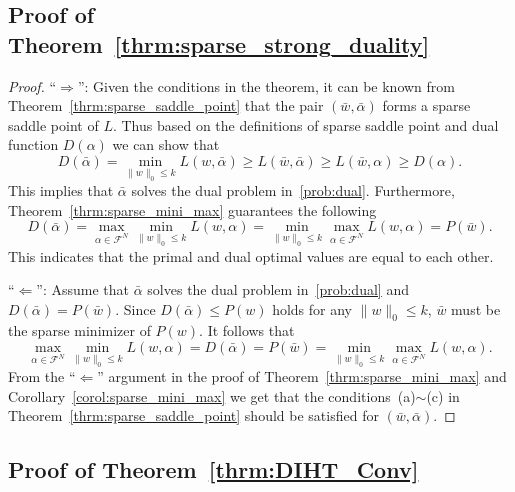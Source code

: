 \documentclass[11pt]{article}
\numberwithin{equation}{section}
\numberwithin{table}{section}
\numberwithin{figure}{section}
\begin{document}
\subsection{Proof of Theorem~\ref{thrm:sparse_strong_duality}}
\label{append:proof_sparse_strong_duality}
\begin{proof}
``$\Rightarrow$'': Given the conditions in the theorem, it can be known from Theorem~\ref{thrm:sparse_saddle_point} that the pair $(\bar w, \bar\alpha)$ forms a sparse saddle point of $L$. Thus based on the definitions of sparse saddle point and dual function $D(\alpha)$ we can show that
\[
D(\bar \alpha) = \min_{\|w\|_0\le k} L(w, \bar\alpha) \ge L(\bar w, \bar\alpha) \ge L(\bar w, \alpha)\ge D(\alpha).
\]
This implies that $\bar\alpha$ solves the dual problem in~\eqref{prob:dual}. Furthermore, Theorem~\ref{thrm:sparse_mini_max} guarantees the following
\[
D(\bar\alpha) = \max_{\alpha \in \mathcal{F}^N} \min_{\|w\|_0\le k} L(w, \alpha) =\min_{\|w\|_0\le k}\max_{\alpha \in \mathcal{F}^N} L(w,\alpha) = P(\bar w).
\]
This indicates that the primal and dual optimal values are equal to each other.

``$\Leftarrow$'': Assume that $\bar\alpha$ solves the dual problem in~\eqref{prob:dual} and $D(\bar\alpha) = P(\bar w)$. Since $D(\bar\alpha)\le P(w)$ holds for any $\|w\|_0\le k$, $\bar w$ must be the sparse minimizer of $P(w)$. It follows that
\[
\max_{\alpha \in \mathcal{F}^N} \min_{\|w\|_0\le k} L(w, \alpha) = D(\bar\alpha) =P(\bar w) = \min_{\|w\|_0\le k}\max_{\alpha \in \mathcal{F}^N} L(w,\alpha).
\]
From the ``$\Leftarrow$'' argument in the proof of Theorem~\ref{thrm:sparse_mini_max} and Corollary~\ref{corol:sparse_mini_max} we get that the conditions~(a)$\sim$(c) in Theorem~\ref{thrm:sparse_saddle_point} should be satisfied for $(\bar w, \bar\alpha)$.
\end{proof}

\subsection{Proof of Theorem~\ref{thrm:DIHT_Conv}}
\label{append:proof_DIHT_conv}
\end{document}
